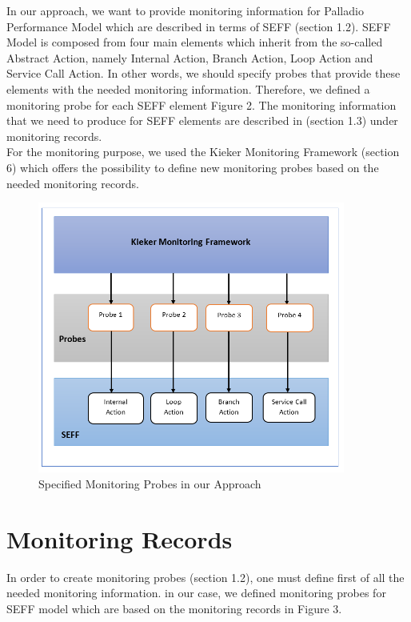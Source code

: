 In our approach, we want to provide monitoring information for Palladio Performance Model which are described in terms of SEFF (section 1.2).   SEFF Model is composed from four main elements which inherit from the so-called Abstract Action, namely Internal Action, Branch Action, Loop Action and Service Call Action. In other words, we should specify probes that provide these elements with the needed monitoring information. Therefore, we defined a monitoring probe for each SEFF element Figure 2. The monitoring information that we need to produce for SEFF elements are described in (section 1.3) under monitoring records.  \\

For the monitoring purpose, we used the Kieker Monitoring Framework (section 6) which offers the possibility to define new monitoring probes based on the needed monitoring records.\\

\begin{figure}[h]
\centering
\includegraphics[width=0.9\textwidth]{figures/probes}
\caption{Specified Monitoring Probes in our Approach}
\label{fig:Specified Monitoring Probes in our Approach}
\end{figure}

\section{Monitoring Records}
\label{sec:Monitoring Records}
In order to create monitoring probes (section 1.2), one must define first of all   the needed monitoring information. in our case, we defined monitoring probes for SEFF model which are based on the monitoring records in Figure 3. \\

